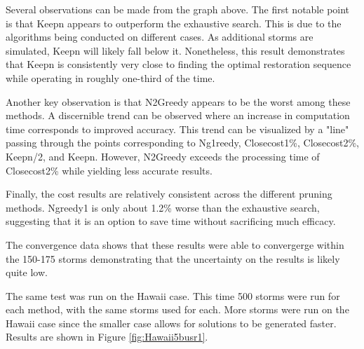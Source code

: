 \documentclass[12pt]{article}
\begin{document}
Several observations can be made from the graph above. The first notable point is that Keepn appears to outperform the exhaustive search. This is due to the algorithms being conducted on different cases. As additional storms are simulated, Keepn will likely fall below it. Nonetheless, this result demonstrates that Keepn is consistently very close to finding the optimal restoration sequence while operating in roughly one-third of the time. \par
Another key observation is that N2Greedy appears to be the worst among these methods. A discernible trend can be observed where an increase in computation time corresponds to improved accuracy. This trend can be visualized by a "line" passing through the points corresponding to Ng1reedy, Closecost1\%, Closecost2\%, Keepn/2, and Keepn. However, N2Greedy exceeds the processing time of Closecost2\% while yielding less accurate results. \par
Finally, the cost results are relatively consistent across the different pruning methods. Ngreedy1 is only about 1.2\% worse than the exhaustive search, suggesting that it is an option to save time without sacrificing much efficacy. \par

The convergence data shows that these results were able to convergerge within the 150-175 storms demonstrating that the uncertainty on the results is likely quite low.\par

The same test was run on the Hawaii case. This time 500 storms were run for each method, with the same storms used for each. More storms were run on the Hawaii case since the smaller case allows for solutions to be generated faster. Results are shown in Figure \ref{fig:Hawaii5busr1}.
\end{document}
